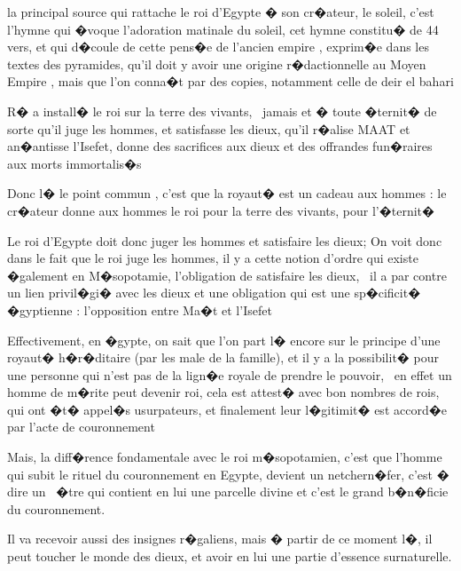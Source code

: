 \documentclass{article}
\begin{document}
\bigskip

la principal source qui rattache le roi d'Egypte � son cr�ateur, le soleil, c'est l'hymne qui �voque l'adoration matinale du soleil, cet hymne constitu� de 44 vers, et qui d�coule de cette pens�e de l'ancien empire , exprim�e dans les textes des pyramides, qu'il doit y avoir une origine r�dactionnelle au Moyen Empire , mais que l'on conna�t par des copies, notamment celle de deir el bahari


\bigskip

R� a install� le roi sur la terre des vivants, \ jamais et � toute �ternit� de sorte qu'il juge les hommes, et satisfasse les dieux, qu'il r�alise MAAT et an�antisse l'Isefet, donne des sacrifices aux dieux et des offrandes fun�raires aux morts immortalis�s


\bigskip

Donc l� le point commun , c'est que la royaut� est un cadeau aux hommes : le cr�ateur donne aux hommes le roi pour la terre des vivants, pour l'�ternit�

Le roi d'Egypte doit donc juger les hommes et satisfaire les dieux; On voit donc dans le fait que le roi juge les hommes, il y a cette notion d'ordre qui existe �galement en M�sopotamie, l'obligation de satisfaire les dieux, \ il a par contre un lien privil�gi� avec les dieux et une obligation qui est une sp�cificit� �gyptienne : l'opposition entre Ma�t et l'Isefet


\bigskip

Effectivement, en �gypte, on sait que l'on part l� encore sur le principe d'une royaut� h�r�ditaire (par les male de la famille), et il y a la possibilit� pour une personne qui n'est pas de la lign�e royale de prendre le pouvoir, \ en effet un homme de m�rite peut devenir roi, cela est attest� avec bon nombres de rois, qui ont �t� appel�s usurpateurs, et finalement leur l�gitimit� est accord�e par l'acte de couronnement


\bigskip

Mais, la diff�rence fondamentale avec le roi m�sopotamien, c'est que l'homme qui subit le rituel du couronnement en Egypte, devient un netchern�fer, c'est � dire un \ �tre qui contient en lui une parcelle divine et c'est le grand b�n�ficie du couronnement.

Il va recevoir aussi des insignes r�galiens, mais � partir de ce moment l�, il peut toucher le monde des dieux, et avoir en lui une partie d'essence surnaturelle.


\bigskip
\end{document}
